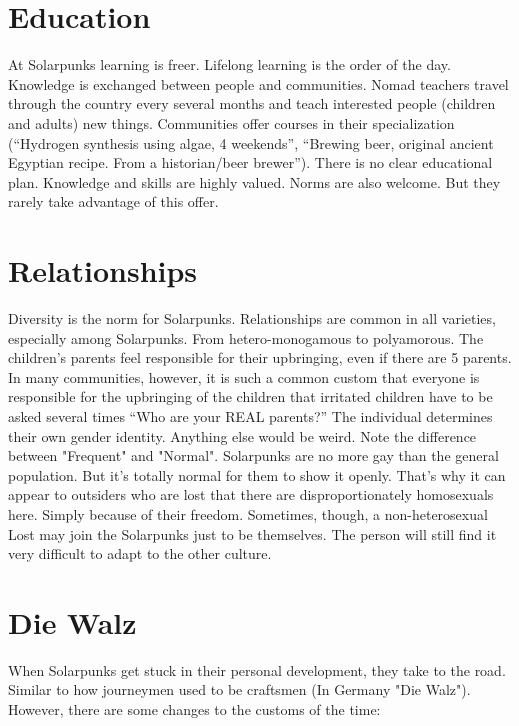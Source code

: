 \section{Education}
At Solarpunks learning is freer. Lifelong learning is the order of the day. Knowledge is exchanged between people and communities. Nomad teachers travel through the country every several months and teach interested people (children and adults) new things. Communities offer courses in their specialization (“Hydrogen synthesis using algae, 4 weekends”, “Brewing beer, original ancient Egyptian recipe. From a historian/beer brewer”). There is no clear educational plan. Knowledge and skills are highly valued. Norms are also welcome. But they rarely take advantage of this offer.

\section{Relationships}
Diversity is the norm for Solarpunks.
Relationships are common in all varieties, especially among Solarpunks. From hetero-monogamous to polyamorous. The children's parents feel responsible for their upbringing, even if there are 5 parents. In many communities, however, it is such a common custom that everyone is responsible for the upbringing of the children that irritated children have to be asked several times “Who are your REAL parents?” The individual determines their own gender identity. Anything else
would be weird.
Note the difference between "Frequent" and "Normal". Solarpunks are no more gay than the general population. But it's totally normal for them to show it openly. That's why it can appear to outsiders who are lost that there are disproportionately homosexuals here. Simply because of their freedom.
Sometimes, though, a non-heterosexual Lost may join the Solarpunks just to be themselves. The person will still find it very difficult to adapt to the other culture.

\section{Die Walz}
When Solarpunks get stuck in their personal development, they take to the road. Similar to how journeymen used to be craftsmen (In Germany "Die Walz"). However, there are some changes to the customs of the time:

